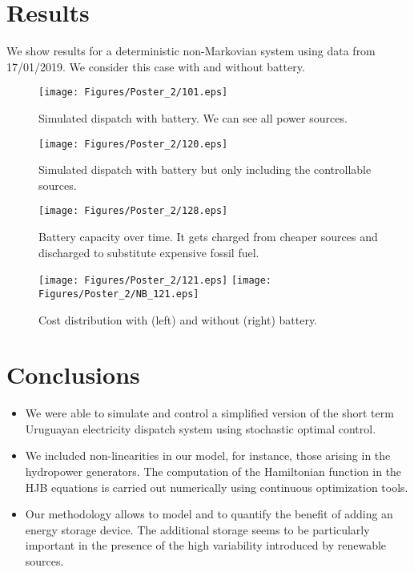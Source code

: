 \documentclass[ima, 20pt, portrait, plainboxedsections]{sciposter}
\begin{document}
\begin{multicols}{3}
\section*{Results} 
We show results for a deterministic non-Markovian system using data from 17/01/2019. We consider this case with and without battery.\\

\begin{figure}[ht!]
\centering
\texttt{[image: Figures/Poster\_2/101.eps]}
\caption{Simulated dispatch with battery. We can see all power sources.}
\end{figure} 
 
\begin{figure}[ht!]
\centering
\texttt{[image: Figures/Poster\_2/120.eps]}
\caption{Simulated dispatch with battery but only including the controllable sources.}
\end{figure}

\begin{figure}[ht!]
\centering
\texttt{[image: Figures/Poster\_2/128.eps]}
\caption{Battery capacity over time. It gets charged from cheaper sources and discharged to substitute expensive fossil fuel.}
\end{figure}

\begin{figure}[ht!]
\centering
{\texttt{[image: Figures/Poster\_2/121.eps]}}\quad\quad\quad
{\texttt{[image: Figures/Poster\_2/NB\_121.eps]}}
\caption{Cost distribution with (left) and without (right) battery.}
\end{figure}

 
\section*{Conclusions}
  
\begin{itemize}

\item We were able to simulate and control a simplified version of the short term Uruguayan electricity dispatch system using stochastic optimal control.
\item We included non-linearities in our model, for instance, those arising in the hydropower generators. The computation of the Hamiltonian function in the HJB equations is carried out numerically using continuous optimization tools.
\item Our methodology allows to model and to quantify the benefit of adding an energy storage device. The additional storage seems to be particularly important in the presence of the high variability introduced by renewable sources.


\end{itemize}
\end{multicols}
\end{document}
